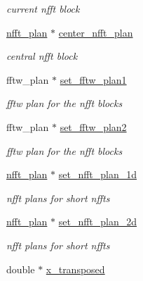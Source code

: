 \begin{CompactItemize}
\begin{CompactList}\small\item\em current nfft block \item\end{CompactList}\item 
\hypertarget{structnsfft__plan_o11}{
\hyperlink{structnfft__plan}{nfft\_\-plan} $\ast$ \hyperlink{structnsfft__plan_o11}{center\_\-nfft\_\-plan}}
\label{structnsfft__plan_o11}

\begin{CompactList}\small\item\em central nfft block \item\end{CompactList}\item 
\hypertarget{structnsfft__plan_o12}{
fftw\_\-plan $\ast$ \hyperlink{structnsfft__plan_o12}{set\_\-fftw\_\-plan1}}
\label{structnsfft__plan_o12}

\begin{CompactList}\small\item\em fftw plan for the nfft blocks \item\end{CompactList}\item 
\hypertarget{structnsfft__plan_o13}{
fftw\_\-plan $\ast$ \hyperlink{structnsfft__plan_o13}{set\_\-fftw\_\-plan2}}
\label{structnsfft__plan_o13}

\begin{CompactList}\small\item\em fftw plan for the nfft blocks \item\end{CompactList}\item 
\hypertarget{structnsfft__plan_o14}{
\hyperlink{structnfft__plan}{nfft\_\-plan} $\ast$ \hyperlink{structnsfft__plan_o14}{set\_\-nfft\_\-plan\_\-1d}}
\label{structnsfft__plan_o14}

\begin{CompactList}\small\item\em nfft plans for short nffts \item\end{CompactList}\item 
\hypertarget{structnsfft__plan_o15}{
\hyperlink{structnfft__plan}{nfft\_\-plan} $\ast$ \hyperlink{structnsfft__plan_o15}{set\_\-nfft\_\-plan\_\-2d}}
\label{structnsfft__plan_o15}

\begin{CompactList}\small\item\em nfft plans for short nffts \item\end{CompactList}\item 
\hypertarget{structnsfft__plan_o16}{
double $\ast$ \hyperlink{structnsfft__plan_o16}{x\_\-transposed}}
\label{structnsfft__plan_o16}


\end{CompactItemize}

